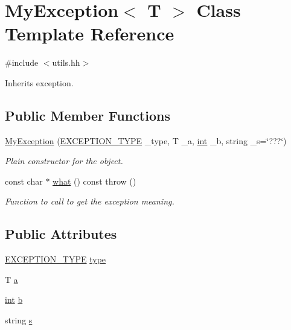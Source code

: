 \hypertarget{class_my_exception}{}\section{My\+Exception$<$ T $>$ Class Template Reference}
\label{class_my_exception}


{\ttfamily \#include $<$utils.\+hh$>$}



Inherits exception.

\subsection*{Public Member Functions}
\begin{DoxyCompactItemize}
\item 
\mbox{\hyperlink{class_my_exception_a64761d17cba58aea7336353837d7a80c}{My\+Exception}} (\mbox{\hyperlink{utils_8hh_af26a5d951fd6ab4b44e6cd8425aa0383}{E\+X\+C\+E\+P\+T\+I\+O\+N\+\_\+\+T\+Y\+PE}} \+\_\+type, T \+\_\+a, \mbox{\hyperlink{draw_8hh_aa620a13339ac3a1177c86edc549fda9b}{int}} \+\_\+b, string \+\_\+s=\char`\"{}???\char`\"{})
\begin{DoxyCompactList}\small\item\em Plain constructor for the object. \end{DoxyCompactList}\item 
const char $\ast$ \mbox{\hyperlink{class_my_exception_ad0a4ef3c9897eb136fa37aec342406fd}{what}} () const  throw ()
\begin{DoxyCompactList}\small\item\em Function to call to get the exception meaning. \end{DoxyCompactList}\end{DoxyCompactItemize}
\subsection*{Public Attributes}
\begin{DoxyCompactItemize}
\item 
\mbox{\hyperlink{utils_8hh_af26a5d951fd6ab4b44e6cd8425aa0383}{E\+X\+C\+E\+P\+T\+I\+O\+N\+\_\+\+T\+Y\+PE}} \mbox{\hyperlink{class_my_exception_a6a422c140340e945df9548f548ea0ed8}{type}}
\item 
T \mbox{\hyperlink{class_my_exception_ae4b514f28c88dc08e7a27bc04f3b4655}{a}}
\item 
\mbox{\hyperlink{draw_8hh_aa620a13339ac3a1177c86edc549fda9b}{int}} \mbox{\hyperlink{class_my_exception_a42f4256beeac79f7ad8ad9682a9b83ee}{b}}
\item 
string \mbox{\hyperlink{class_my_exception_ac8762871298754f14ce579ee2c928510}{s}}
\end{DoxyCompactItemize}


